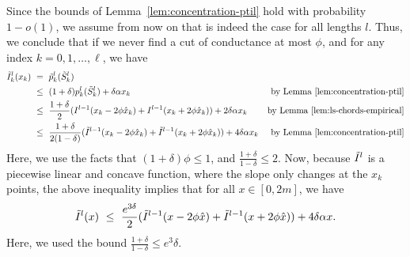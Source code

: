 \documentclass[11pt]{article}
\begin{document}
Since the bounds of Lemma~\ref{lem:concentration-ptil} hold with probability $1 - o(1)$, we assume from now on that is indeed the case for all lengths $l$. Thus, we conclude that if we never find a cut of conductance at most $\phi$, and for any index $k = 0, 1, \ldots, \ell$, we have
\begin{align*}
\tilde{I}^l_k(x_k)\ &=\ \tilde{p}^l_k(\tilde{S}^l_k)\\
&\leq\ (1+\delta)p^l_k(\tilde{S}^l_k) + \delta\alpha x_k & \text{by Lemma~\ref{lem:concentration-ptil}}\\
&\leq\ \frac{1+\delta}{2}(I^{l-1}(x_k - 2\phi\hat{x}_k) + I^{l-1}(x_k + 2\phi\hat{x}_k)) + 2\delta\alpha x_k & \text{by Lemma~\ref{lem:ls-chords-empirical}}\\
&\leq\ \frac{1+\delta}{2(1-\delta)}(\tilde{I}^{l-1}(x_k - 2\phi\hat{x}_k) + \tilde{I}^{l-1}(x_k + 2\phi\hat{x}_k)) + 4\delta\alpha x_k & \text{by Lemma~\ref{lem:concentration-ptil}}
\end{align*}
Here, we use the facts that $(1+\delta)\phi \leq 1$, and $\frac{1+\delta}{1-\delta} \leq 2$. Now, because $\tilde{I}^l$ is a piecewise linear and concave
function, where the slope only changes at the $x_k$ points, the above
inequality implies that for all $x \in [0, 2m]$, we have
$$\Itil^l(x)\ \leq\ \frac{e^{3\delta}}{2}(\Itil^{l-1}(x - 2\phi \hat{x}) + \Itil^{l-1}(x + 2\phi \hat{x})) + 4\delta\alpha x.$$
Here, we used the bound $\frac{1+\delta}{1-\delta} \leq e^3\delta$.
\end{document}
